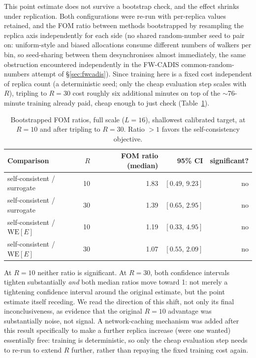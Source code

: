 \documentclass[a4paper,fleqn]{cas-sc}
\begin{document}
This point estimate does not survive a bootstrap check, and the effect shrinks
	under replication. Both configurations were re-run with per-replica values retained, and
the FOM ratio between methods bootstrapped by resampling the replica axis independently for
each side (no shared random-number seed to pair on: uniform-style and biased allocations
consume different numbers of walkers per bin, so seed-sharing between them desynchronises
almost immediately, the same obstruction encountered independently in the FW-CADIS
common-random-numbers attempt of \S\ref{sec:fwcadis}). Since training here is a fixed cost
independent of replica count (a deterministic seed; only the cheap evaluation step scales
with $R$), tripling to $R=30$ cost roughly six additional minutes on top of the
$\sim$76-minute training already paid, cheap enough to just check
(Table~\ref{tab:kimcaiboot}).

\begin{table}[H]
\centering\small
\caption{Bootstrapped FOM ratios, full scale ($L=16$), shallowest calibrated target, at
	$R=10$ and after tripling to $R=30$. Ratio $>1$ favors the self-consistency objective.}
\label{tab:kimcaiboot}
\begin{tabular}{lrrrr}
	\toprule
	Comparison & $R$ & FOM ratio (median) & 95\% CI & significant? \\
	\midrule
	self-consistent / surrogate & 10 & 1.83 & $[0.49,\,9.23]$ & no \\
	self-consistent / surrogate & 30 & 1.39 & $[0.65,\,2.95]$ & no \\
	self-consistent / $\mathrm{WE}[E]$ & 10 & 1.19 & $[0.33,\,4.95]$ & no \\
	self-consistent / $\mathrm{WE}[E]$ & 30 & 1.07 & $[0.55,\,2.09]$ & no \\
	\bottomrule
\end{tabular}
\end{table}

At $R=10$ neither ratio is significant. At $R=30$, both confidence intervals tighten
substantially \emph{and} both median ratios move toward 1: not merely a tightening
confidence interval around the original estimate, but the point estimate itself receding.
We read the direction of this shift, not only its final inconclusiveness, as evidence that
the original $R=10$ advantage was substantially noise, not signal. A network-caching
mechanism was added after this result specifically to make a further replica increase (were
one wanted) essentially free: training is deterministic, so only the cheap evaluation step
needs to re-run to extend $R$ further, rather than repaying the fixed training cost again.
\end{document}
